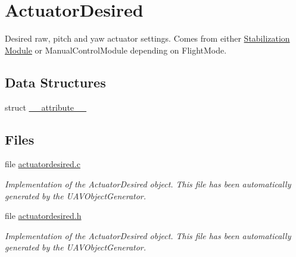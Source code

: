 \hypertarget{group___actuator_desired}{\section{\-Actuator\-Desired}
\label{group___actuator_desired}
}


\-Desired raw, pitch and yaw actuator settings. \-Comes from either \hyperlink{group___stabilization_module}{\-Stabilization \-Module} or \-Manual\-Control\-Module depending on \-Flight\-Mode.  


\subsection*{\-Data \-Structures}
\begin{DoxyCompactItemize}
\item 
struct \hyperlink{struct____attribute____}{\-\_\-\-\_\-attribute\-\_\-\-\_\-}
\end{DoxyCompactItemize}
\subsection*{\-Files}
\begin{DoxyCompactItemize}
\item 
file \hyperlink{actuatordesired_8c}{actuatordesired.\-c}
\begin{DoxyCompactList}\small\item\em \-Implementation of the \-Actuator\-Desired object. \-This file has been automatically generated by the \-U\-A\-V\-Object\-Generator. \end{DoxyCompactList}\item 
file \hyperlink{actuatordesired_8h}{actuatordesired.\-h}
\begin{DoxyCompactList}\small\item\em \-Implementation of the \-Actuator\-Desired object. \-This file has been automatically generated by the \-U\-A\-V\-Object\-Generator. \end{DoxyCompactList}\end{DoxyCompactItemize}
